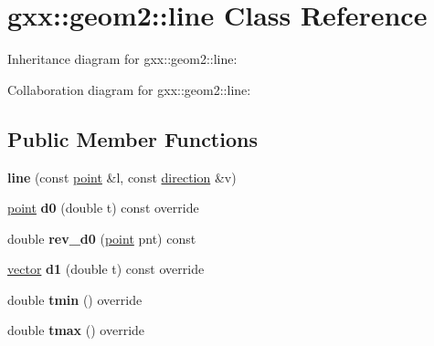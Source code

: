 \hypertarget{classgxx_1_1geom2_1_1line}{}\section{gxx\+:\+:geom2\+:\+:line Class Reference}
\label{classgxx_1_1geom2_1_1line}


Inheritance diagram for gxx\+:\+:geom2\+:\+:line\+:


Collaboration diagram for gxx\+:\+:geom2\+:\+:line\+:
\subsection*{Public Member Functions}
\begin{DoxyCompactItemize}
\item 
{\bfseries line} (const \hyperlink{classmalgo_1_1vector2}{point} \&l, const \hyperlink{classmalgo_1_1unit__vector2}{direction} \&v)\hypertarget{classgxx_1_1geom2_1_1line_a8e6df43baa58693474f1152d75d20904}{}\label{classgxx_1_1geom2_1_1line_a8e6df43baa58693474f1152d75d20904}

\item 
\hyperlink{classmalgo_1_1vector2}{point} {\bfseries d0} (double t) const override\hypertarget{classgxx_1_1geom2_1_1line_a6517fa46b2fb12183138d4a0d0444e8b}{}\label{classgxx_1_1geom2_1_1line_a6517fa46b2fb12183138d4a0d0444e8b}

\item 
double {\bfseries rev\+\_\+d0} (\hyperlink{classmalgo_1_1vector2}{point} pnt) const \hypertarget{classgxx_1_1geom2_1_1line_ac61eb1b6a0c7aa60dea8dbc158556041}{}\label{classgxx_1_1geom2_1_1line_ac61eb1b6a0c7aa60dea8dbc158556041}

\item 
\hyperlink{classmalgo_1_1vector2}{vector} {\bfseries d1} (double t) const override\hypertarget{classgxx_1_1geom2_1_1line_acb91989c411c850a762a60ffa25a0515}{}\label{classgxx_1_1geom2_1_1line_acb91989c411c850a762a60ffa25a0515}

\item 
double {\bfseries tmin} () override\hypertarget{classgxx_1_1geom2_1_1line_af7ffe87dc366567d88723be737055240}{}\label{classgxx_1_1geom2_1_1line_af7ffe87dc366567d88723be737055240}

\item 
double {\bfseries tmax} () override\hypertarget{classgxx_1_1geom2_1_1line_af3d543e7b8ede8cccb9febede48a25ac}{}\label{classgxx_1_1geom2_1_1line_af3d543e7b8ede8cccb9febede48a25ac}


\end{DoxyCompactItemize}
